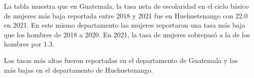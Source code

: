 La tabla muestra que en Guatemala, la tasa neta de escolaridad en el ciclo básico de mujeres más baja reportada entre 2018 y 2021 fue en Huehuetenango con 22.0 en 2021. En este mismo departamento las mujeres reportaron una tasa más baja que los hombres de 2018 a 2020. En 2021, la tasa de mujeres sobrepasó a la de los hombres por 1.3. 

Las tasas más altas fueron reportadas en el departamento de Guatemala y las más bajas en el departamento de Huehuetenango. 